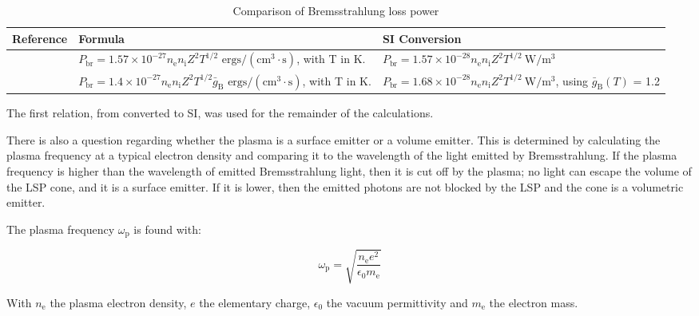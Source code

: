         \begin{table}[!ht]
            \footnotesize
            \centering
            \caption{Comparison of Bremsstrahlung loss power}
            \label{tab:Brems_compare}
            \begin{tabularx}{\textwidth}{@{}lXX@{}}
            \toprule
            \textbf{Reference} & \textbf{Formula} & \textbf{SI Conversion} \\ \midrule
            \textcite{glasstoneControlledThermonuclearReactions1975}  & $P_\mathrm{br} = 1.57 \times 10^{-27} n_\mathrm{e} n_\mathrm{i} Z^2 T^{1/2}$ \: $\mathrm{ergs/(cm^3\cdot s)}$, with T in K. &   $P_\mathrm{br} = 1.57 \times 10^{-28} n_\mathrm{e} n_\mathrm{i} Z^2 T^{1/2} \: \mathrm{W/m^3}$  \\
            \textcite{rybickiRadiativeProcessesAstrophysics2004}      & $P_\mathrm{br} = 1.4 \times 10^{-27} n_\mathrm{e} n_\mathrm{i} Z^2 T^{1/2} \bar{g}_\mathrm{B}$ \: $\mathrm{ergs/(cm^3\cdot s)}$, with T in K.&  $P_\mathrm{br} = 1.68 \times 10^{-28} n_\mathrm{e} n_\mathrm{i} Z^2 T^{1/2} \: \mathrm{W/m^3}$, using $\bar{g}_\mathrm{B} (T)$ = 1.2\\
            \bottomrule          
            \end{tabularx}
        \end{table}

        The first relation, from \textcite{glasstoneControlledThermonuclearReactions1975} converted to SI, was used for the remainder of the calculations.

        There is also a question regarding whether the plasma is a surface emitter or a volume emitter. This is determined by calculating the plasma frequency at a typical electron density and comparing it to the wavelength of the light emitted by Bremsstrahlung. If the plasma frequency is higher than the wavelength of emitted Bremsstrahlung light, then it is cut off by the plasma; no light can escape the volume of the LSP cone, and it is a surface emitter. If it is lower, then the emitted photons are not blocked by the LSP and the cone is a volumetric emitter.
        
        The plasma frequency $\omega_\mathrm{p}$ is found with: 

        \begin{equation}
            \omega_\mathrm{p} = \sqrt{\frac{n_\mathrm{e} e^2}{\epsilon_\mathrm{0} m_\mathrm{e}}}
        \end{equation}

        With $n_\mathrm{e}$ the plasma electron density, $e$ the elementary charge, $\epsilon_\mathrm{0}$ the vacuum permittivity and $m_\mathrm{e}$ the electron mass.


